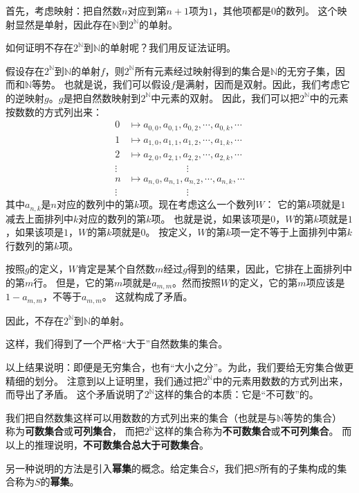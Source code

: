 \documentclass[12pt,UTF8]{ctexbook}
\theoremstyle{definition}
\theoremstyle{plain}
\begin{document}
首先，考虑映射：把自然数$n$对应到第$n+1$项为$1$，其他项都是$0$的数列。
这个映射显然是单射，因此存在$\mathbb{N}$到$2^\mathbb{N}$的单射。

如何证明不存在$2^\mathbb{N}$到$\mathbb{N}$的单射呢？我们用反证法证明。

假设存在$2^\mathbb{N}$到$\mathbb{N}$的单射$f$，则$2^\mathbb{N}$所有元素经过映射得到的集合是$\mathbb{N}$的无穷子集，因而和$\mathbb{N}$等势。
也就是说，我们可以假设$f$是满射，因而是双射。因此，我们考虑它的逆映射$g$。$g$是把自然数映射到$2^\mathbb{N}$中元素的双射。
因此，我们可以把$2^\mathbb{N}$中的元素按数数的方式列出来：
\begin{align*}
    0 &\mapsto a_{0,0}, a_{0,1}, a_{0,2}, \cdots , a_{0,k}, \cdots  \\
    1 &\mapsto a_{1,0}, a_{1,1}, a_{1,2}, \cdots , a_{1,k}, \cdots  \\
    2 &\mapsto a_{2,0}, a_{2,1}, a_{2,2}, \cdots , a_{2,k}, \cdots  \\
    \vdots & \qquad \qquad\qquad \vdots  \\
    n &\mapsto a_{n,0}, a_{n,1}, a_{n,2}, \cdots , a_{n,k}, \cdots  \\
    \vdots & \qquad \qquad\qquad \vdots  
\end{align*}
其中$a_{n,k}$是$n$对应的数列中的第$k$项。现在考虑这么一个数列$W$：
它的第$k$项就是$1$减去上面排列中$k$对应的数列的第$k$项。
也就是说，如果该项是$0$，$W$的第$k$项就是$1$，如果该项是$1$，$W$的第$k$项就是$0$。
按定义，$W$的第$k$项一定不等于上面排列中第$k$行数列的第$k$项。

按照$g$的定义，$W$肯定是某个自然数$m$经过$g$得到的结果，因此，它排在上面排列中的第$m$行。
但是，它的第$m$项就是$a_{m,m}$。然而按照$W$的定义，它的第$m$项应该是$1 - a_{m,m}$，不等于$a_{m,m}$。
这就构成了矛盾。

因此，不存在$2^\mathbb{N}$到$\mathbb{N}$的单射。

这样，我们得到了一个严格“大于”自然数集的集合。

以上结果说明：即便是无穷集合，也有“大小之分”。为此，我们要给无穷集合做更精细的划分。
注意到以上证明里，我们通过把$2^\mathbb{N}$中的元素用数数的方式列出来，而导出了矛盾。
这个矛盾说明了$2^\mathbb{N}$这样的集合的本质：它是“不可数”的。

我们把自然数集这样可以用数数的方式列出来的集合（也就是与$\mathbb{N}$等势的集合）
称为\textbf{可数集合}或\textbf{可列集合}，
而把$2^\mathbb{N}$这样的集合称为\textbf{不可数集合}或\textbf{不可列集合}。
而以上的推理说明，\textbf{不可数集合总大于可数集合}。

另一种说明的方法是引入\textbf{幂集}的概念。给定集合$S$，我们把$S$所有的子集构成的集合称为$S$的\textbf{幂集}。
\end{document}
